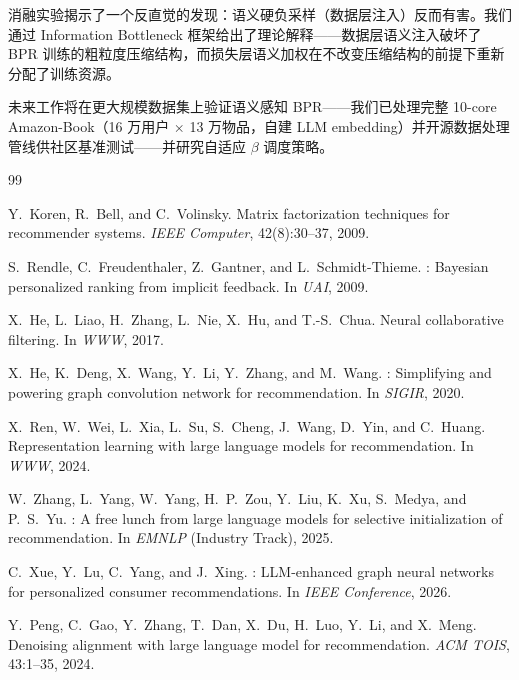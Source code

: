 \documentclass[11pt,a4paper]{article}
\begin{document}
消融实验揭示了一个反直觉的发现：语义硬负采样（数据层注入）反而有害。我们通过 Information Bottleneck 框架给出了理论解释——数据层语义注入破坏了 BPR 训练的粗粒度压缩结构，而损失层语义加权在不改变压缩结构的前提下重新分配了训练资源。

未来工作将在更大规模数据集上验证语义感知 BPR——我们已处理完整 10-core Amazon-Book（16 万用户 $\times$ 13 万物品，自建 LLM embedding）并开源数据处理管线供社区基准测试——并研究自适应 $\beta$ 调度策略。


\begin{thebibliography}{99}

Y.~Koren, R.~Bell, and C.~Volinsky.
\newblock Matrix factorization techniques for recommender systems.
\newblock \emph{IEEE Computer}, 42(8):30--37, 2009.

S.~Rendle, C.~Freudenthaler, Z.~Gantner, and L.~Schmidt-Thieme.
: {B}ayesian personalized ranking from implicit feedback.
\newblock In \emph{UAI}, 2009.

X.~He, L.~Liao, H.~Zhang, L.~Nie, X.~Hu, and T.-S.~Chua.
\newblock Neural collaborative filtering.
\newblock In \emph{WWW}, 2017.

X.~He, K.~Deng, X.~Wang, Y.~Li, Y.~Zhang, and M.~Wang.
: Simplifying and powering graph convolution network for recommendation.
\newblock In \emph{SIGIR}, 2020.

X.~Ren, W.~Wei, L.~Xia, L.~Su, S.~Cheng, J.~Wang, D.~Yin, and C.~Huang.
\newblock Representation learning with large language models for recommendation.
\newblock In \emph{WWW}, 2024.

W.~Zhang, L.~Yang, W.~Yang, H.~P.~Zou, Y.~Liu, K.~Xu, S.~Medya, and P.~S.~Yu.
: A free lunch from large language models for selective initialization of recommendation.
\newblock In \emph{EMNLP} (Industry Track), 2025.

C.~Xue, Y.~Lu, C.~Yang, and J.~Xing.
: {LLM}-enhanced graph neural networks for personalized consumer recommendations.
\newblock In \emph{IEEE Conference}, 2026.

Y.~Peng, C.~Gao, Y.~Zhang, T.~Dan, X.~Du, H.~Luo, Y.~Li, and X.~Meng.
\newblock Denoising alignment with large language model for recommendation.
\newblock \emph{ACM TOIS}, 43:1--35, 2024.


\end{thebibliography}
\end{document}
